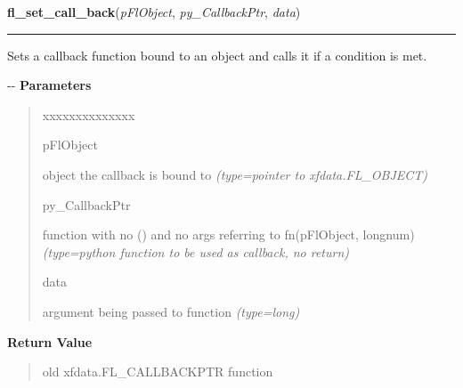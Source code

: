     \label{xformslib:flbasic:fl_set_object_callback}

    \vspace{0.5ex}

\hspace{.8\funcindent}\begin{boxedminipage}{\funcwidth}

    \raggedright \textbf{fl\_set\_call\_back}(\textit{pFlObject}, \textit{py\_CallbackPtr}, \textit{data})

    \vspace{-1.5ex}

    \rule{\textwidth}{0.5\fboxrule}
\setlength{\parskip}{2ex}

Sets a callback function bound to an object and calls it if a condition
is met.

-{}-
\setlength{\parskip}{1ex}
      \textbf{Parameters}
      \vspace{-1ex}

      \begin{quote}
        \begin{Ventry}{xxxxxxxxxxxxxx}

          \item[pFlObject]


object the callback is bound to
            {\it (type=pointer to xfdata.FL\_OBJECT)}

          \item[py\_CallbackPtr]


function with no () and no args referring to fn(pFlObject, longnum)
            {\it (type=python function to be used as callback, no return)}

          \item[data]


argument being passed to function
            {\it (type=long)}

        \end{Ventry}

      \end{quote}

      \textbf{Return Value}
    \vspace{-1ex}

      \begin{quote}

old xfdata.FL\_CALLBACKPTR function
      \end{quote}


\end{boxedminipage}
